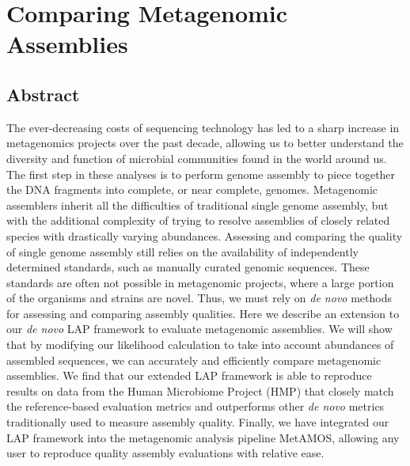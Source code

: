 
\renewcommand{\thechapter}{3}

\chapter{Comparing Metagenomic Assemblies}

\section{Abstract}
The ever-decreasing costs of sequencing technology has led to a sharp increase in metagenomics projects over the past decade, allowing us to better understand the diversity and function of microbial communities found in the world around us.
The first step in these analyses is to perform
genome assembly to piece together the DNA fragments into complete, or
near complete, genomes.
Metagenomic assemblers inherit all the difficulties of traditional single genome assembly, but with the additional complexity of trying to resolve assemblies of closely related species with drastically varying abundances.
Assessing and comparing the quality of single genome assembly still relies on the availability of independently determined standards, such as manually curated genomic sequences.
These standards are often not possible in metagenomic projects, where a large portion of the organisms and strains are novel.
Thus, we must rely on \emph{de novo} methods for assessing and comparing assembly qualities.
Here we describe an extension to our \emph{de novo} LAP framework to evaluate metagenomic assemblies.
We will show that by modifying our likelihood calculation to take into account abundances of assembled sequences, we can accurately and efficiently compare metagenomic assemblies.
We find that our extended LAP framework is able to reproduce results on data from the Human Microbiome Project (HMP) that closely match the reference-based evaluation metrics and outperforms other \emph{de novo} metrics traditionally used to measure assembly quality.
Finally, we have integrated our LAP framework into the metagenomic analysis pipeline MetAMOS, allowing any user to reproduce quality assembly evaluations with relative ease.


